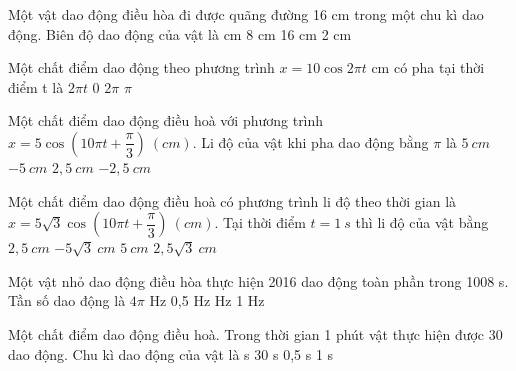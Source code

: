 \begin{ex}%
Một vật dao động điều hòa đi được quãng đường 16 cm trong một chu kì dao động. Biên độ dao động của vật là
\choice
{ cm}
{8 cm}
{16 cm}
{2 cm}
\end{ex} 
\begin{ex}%
Một chất điểm dao động theo phương trình $x = 10\cos2\pi t$ cm có pha tại thời điểm t là
\choice
{\True $2\pi t$}
{0}
{$2\pi$}
{$\pi$}
\end{ex} 
\begin{ex}
Một chất điểm dao động điều hoà với phương trình $x=5\cos(10\pi t+\dfrac{\pi}{3})\ (cm)$. Li độ của vật khi pha dao động bằng $\pi$ là
\choice
{$5\ cm$}
{\True $-5\ cm$}
{$2,5\ cm$}
{$-2,5\ cm$}
\end{ex} 
\begin{ex}
Một chất điểm dao động điều hoà có phương trình li độ theo thời gian là  $x=5\sqrt 3\cos(10\pi t+\dfrac{\pi}{3})\ (cm)$. Tại thời điểm $t=1\ s$ thì li độ của vật bằng
\choice
{$2,5\ cm$}
{$-5\sqrt 3\ cm$}
{$5\ cm$}
{\True $2,5\sqrt 3\ cm$}
\end{ex} 
\begin{ex}%
Một vật nhỏ dao động điều hòa thực hiện 2016 dao động toàn phần trong 1008 s. Tần số dao động là
\choice
{$4\pi$  Hz}
{0,5 Hz}
{ Hz}
{1 Hz}
\end{ex} 

\begin{ex}
Một chất điểm dao động điều hoà. Trong thời gian 1 phút vật thực hiện được 30 dao động. Chu kì dao động của vật là
\choice
{ s}
{30 s}
{0,5 s}
{1 s}
\end{ex} 


